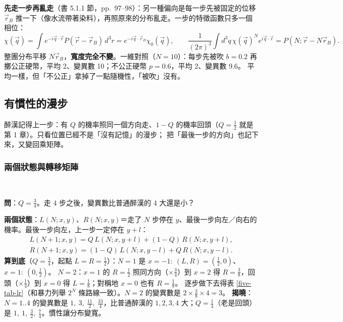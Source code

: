 \textbf{先走一步再亂走}（書 5.1.1 節，pp.~97--98）：另一種偏向是每一步先被固定的位移 $\vec r_B$ 推一下（像水流帶著染料），再照原來的分布亂走。一步的特徵函數只多一個相位：
\[\chi(\vec q)=\int e^{-i\vec q\cdot\vec r}P(\vec r-\vec r_B)\,d^3r=e^{-i\vec q\cdot\vec r_B}\chi_0(\vec q),\qquad
\frac{1}{(2\pi)^3}\int d^3q\,\chi(\vec q)^Ne^{i\vec q\cdot\vec r}=P(N;\vec r-N\vec r_B).\tag{5.9, 5.10}\]
整團分布平移 $N\vec r_B$，\textbf{寬度完全不變}。一維對照（$N=10$）：每步先被吹 $b=0.2$ 再擲公正硬幣，平均 2、變異數 10；不公正硬幣 $p=0.6$，平均 2、變異數 9.6。
平均一樣，但「不公正」拿掉了一點隨機性，「被吹」沒有。

\subsection{有慣性的漫步}
\leavevmode{}\quad 醉漢記得上一步：有 $Q$ 的機率照同一個方向走、$1-Q$ 的機率回頭（$Q=\frac12$ 就是第 1 章）。只看位置已經不是「沒有記憶」的漫步；
把「最後一步的方向」也記下來，又變回乘矩陣。

\subsubsection{兩個狀態與轉移矩陣}
\leavevmode{}\ \par\nopagebreak

\textbf{問}：$Q=\frac34$。走 4 步之後，變異數比普通醉漢的 4 大還是小？

\textbf{兩個狀態}：$L(N;x,y)$、$R(N;x,y)$＝走了 $N$ 步停在 $y$、最後一步向左／向右的機率。最後一步向左，上一步一定停在 $y+l$：
\begin{gather*}
L(N+1;x,y)=Q\,L(N;x,y+l)+(1-Q)\,R(N;x,y+l),\tag{5.11}\\
R(N+1;x,y)=(1-Q)\,L(N;x,y-l)+Q\,R(N;x,y-l).\tag{5.12}
\end{gather*}
\textbf{算到底}（$Q=\frac34$，起點 $L=R=\frac12$）：$N=1$ 是 $x=-1{:}\ (L,R)=(\frac12,0)$、$x=1{:}\ (0,\frac12)$。
$N=2$：$x=1$ 的 $R=\frac12$ 照同方向（$\times\frac34$）到 $x=2$ 得 $R=\frac38$，回頭（$\times\frac14$）到 $x=0$ 得 $L=\frac18$；對稱地 $x=0$ 也有 $R=\frac18$。
逐步做下去得表 \ref{five-tab-lr}（和暴力列舉 $2^N$ 條路線一致）。$N=2$ 的變異數是 $2\times\frac38\times4=3$。
\textbf{揭曉}：$N=1..4$ 的變異數是 $1,\ 3,\ \frac{11}2,\ \frac{33}4$，比普通醉漢的 $1,2,3,4$ 大；$Q=\frac14$（老是回頭）是 $1,\ 1,\ \frac32,\ \frac74$。慣性讓分布變寬。

\begin{table}[htbp]
\centering
\FiveTabLR\\[5pt]
{\small\FiveTabPVar}
\caption{有慣性的漫步。上：$Q=\frac34$ 的逐步表，每格是 $(L,R)$，兩數相加是停在 $x$ 的機率。
下左：小 $N$ 的變異數與持續長度 $n$（$Q=\frac12$ 是普通醉漢）；下右：大 $N$ 時精確值 $\to NQ/(1-Q)+$ 常數（5.2.2 節）}\label{five-tab-lr}\label{five-tab-pvar}
\end{table}

